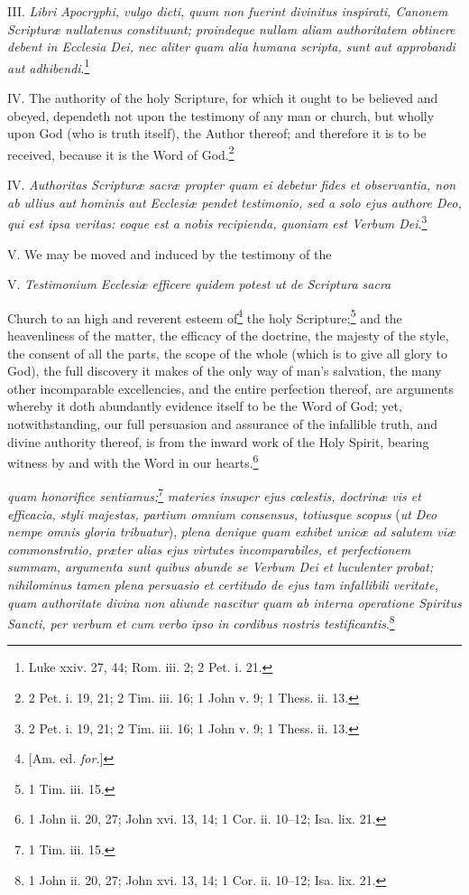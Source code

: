 III. \emph{Libri Apocryphi, vulgo dicti, quum non fuerint divinitus inspirati, Canonem Scripturæ nullatenus constituunt; proindeque nullam aliam authoritatem obtinere debent in Ecclesia Dei, nec aliter quam alia humana scripta, sunt aut approbandi aut adhibendi}.\footnote{Luke xxiv. 27, 44; Rom. iii. 2; 2 Pet. i. 21.}

IV. The authority of the holy Scripture, for which it ought to be believed and obeyed, dependeth not upon the testimony of any man or church, but wholly upon God (who is truth itself), the Author thereof; and therefore it is to be received, because it is the Word of God.\footnote{2 Pet. i. 19, 21; 2 Tim. iii. 16; 1 John v. 9;  1 Thess. ii. 13.}

IV. \emph{Authoritas Scripturæ sacræ propter quam ei debetur fides et observantia, non ab ullius aut hominis aut Ecclesiæ pendet testimonio, sed a solo ejus authore Deo, qui est ipsa veritas: eoque est a nobis recipienda, quoniam est Verbum Dei}.\footnote{2 Pet. i. 19, 21; 2 Tim. iii. 16; 1 John v. 9;  1 Thess. ii. 13.}

V. We may be moved and induced by the testimony of the

V. \emph{Testimonium Ecclesiæ efficere quidem potest ut de Scriptura sacra }

Church to an high and reverent esteem of\footnote{[Am. ed. \emph{ for.}]} the holy Scripture;\footnote{1 Tim. iii. 15.} and the heavenliness of the matter, the efficacy of the doctrine, the majesty of the style, the consent of all the parts, the scope of the whole (which is to give all glory to God), the full discovery it makes of the only way of man's salvation, the many other incomparable excellencies, and the entire perfection thereof, are arguments whereby it doth abundantly evidence itself to be the Word of God; yet, notwithstanding, our full persuasion and assurance of the infallible truth, and divine authority thereof, is from the inward work of the Holy Spirit, bearing witness by and with the Word in our hearts.\footnote{1 John ii. 20, 27;  John xvi. 13, 14; 1 Cor. ii. 10–12; Isa. lix. 21.}

\emph{quam honorifice sentiamus;}\footnote{1 Tim. iii. 15.}\emph{ materies insuper ejus cœlestis, doctrinæ vis et efficacia, styli majestas, partium omnium consensus, totiusque scopus} (\emph{ut Deo nempe omnis gloria tribuatur}), \emph{plena denique quam exhibet unicæ ad salutem viæ commonstratio, præter alias ejus virtutes incomparabiles, et perfectionem summam, argumenta sunt quibus abunde se Verbum Dei et luculenter probat; nihilominus tamen plena persuasio et certitudo de ejus tam infallibili veritate, quam authoritate divina non aliunde nascitur quam ab interna operatione Spiritus Sancti, per verbum et cum verbo ipso in cordibus nostris testificantis}.\footnote{1 John ii. 20, 27; John xvi. 13, 14; 1 Cor. ii. 10–12;  Isa. lix. 21.}

